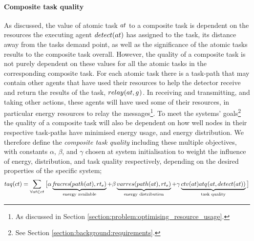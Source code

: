 \paragraph{Composite task quality}
\label{section:composite_task_quality}

\newcommand{\functionCompositeTaskQuality}[2]{
	\functionSignature{taq}{\varCompositeTask{}{}}
}

As discussed, the value of atomic task $\varAtomicTask{}{}$ to a composite task is dependent on the resources the executing agent $\functionDetectorRole{}{}$ has assigned to the task, its distance away from the tasks demand point, as well as the significance of the atomic tasks results to the composite task overall. However, the quality of a composite task is not purely dependent on these values for all the atomic tasks in the corresponding composite task. For each atomic task there is a task-path that may contain other agents that have used their resources to help the detector receive and return the results of the task, $\functionRelayRole{}{}{}$. In receiving and transmitting, and taking other actions, these agents will have used some of their resources, in particular energy resources to relay the messages\footnote{As discussed in Section \ref{section:problem:optimising_resource_usage}.}. To meet the systems' goals\footnote{See Section \ref{section:background:requirements}.}  the quality of a composite task will also be dependent on how well nodes in their respective task-paths have minimised energy usage, and energy distribution.  We therefore define the \textit{composite task quality} including these multiple objectives, with constants $\alpha$, $\beta$, and $\gamma$ chosen at system initialisation to weight the influence of energy, distribution, and task quality respectively, depending on the desired properties of the specific system; 
\begin{equation}
	\label{eq:taq}
	\functionCompositeTaskQuality{}{} = 
	\sum\limits_{\forall \varAtomicTask{}{} \in \varCompositeTask{}{}}
	\big\lbrack
	\alpha\underbrace{\functionTaskPathEnergyAvailable{}{}}_{\text{energy available}}
	+ \beta\underbrace{\functionTaskPathEnergyVariability{\functionTaskArc{}{}}{}}_{\text{energy distribution}}
	+ 
	\gamma\underbrace{
		\functionComponentTaskValue{}{}
		\functionAtomicTaskQualitySignature{\varAtomicTask{}{}}{\functionDetectorRole{}{}}
	}_{\text{task quality}}
\big\rbrack
\end{equation}

